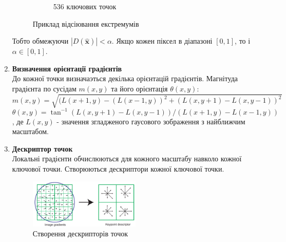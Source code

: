 \begin{enumerate}
\begin{figure}[H]
\begin{subfigure}[c]{0.3\textwidth}
                \caption{ 536 ключових точок
                \label{fig:swift5}
                }
            \end{subfigure}
            \caption{Приклад відсіювання екстремумів
            \label{fig:sift45}
            }
        \end{figure}
        Тобто обмежуючи $|D(\widehat{\textbf{x}})| < \alpha$. Якщо кожен піксел в діапазоні $[0,1]$, то і 
        $ \alpha \in [0,1]$.
    \item \textbf{Визначення орієнтації градієнтів} \\
        До кожної точки визначаэться декілька орієнтацій градієнтів.
        Магнітуда градієнта по сусідам $m(x,y)$ та його орієнтація $\theta(x,y)$:
        \begin{equation}
            m(x,y) = \sqrt{(L(x+1,y) - (L(x-1,y))^2 + (L(x,y+1) - L(x,y-1))^2}
        \end{equation}
        \begin{equation}
        \theta(x,y) = \tan^{-1} (L(x,y+1) - L(x,y-1))/(L(x+1,y) - L(x-1,y))
        \end{equation}
        , де $L(x,y)$ - значення згладженого гаусового зображення з найближчим масштабом.

    \item \textbf{Дескриптор точок} \\
        Локальні градієнти обчислюються для кожного масштабу навколо кожної ключової точки.
        Створюються дескриптори кожної ключової точки.
        \begin{figure}[H]
            \centering
            \includegraphics[width=0.5\textwidth]{images/sift6}
            \caption{Створення дескрипторів точок}
            \label{fig:swift6}
        \end{figure}
\end{enumerate}